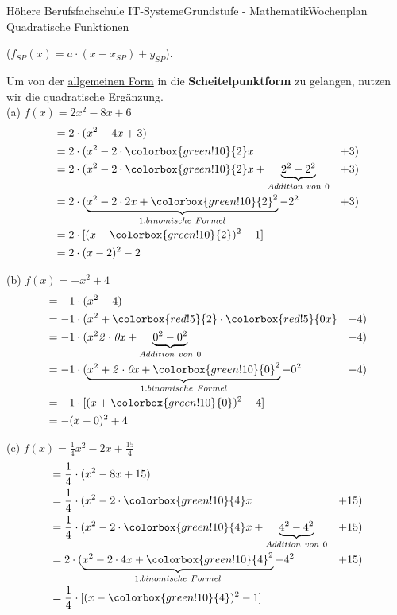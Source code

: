 \documentclass[oneside,openany,headings=optiontotoc,11pt,numbers=noenddot]{scrreprt}
\begin{document}
\begin{worksheet}{Höhere Berufsfachschule IT-Systeme}{Grundstufe - Mathematik}{Wochenplan Quadratische Funktionen}
\begin{framed}
			(\(f_{SP}(x) = a\cdot(x - x_{SP}) + y_{SP}\)).\\
			\par\noindent
			Um von der \underline{allgemeinen Form} in die \textbf{Scheitelpunktform} zu gelangen, nutzen wir die quadratische Ergänzung.\\
			(a) \(f(x) = 2x^2-8x+6\)\\
			\begin{align*}
				& = 2\cdot{}(x^2-4x+3)\\
				& = 2\cdot{}(x^2 - 2\cdot{}\colorbox{green!10}{2}x & +3)\\
				& = 2\cdot{}(x^2 - 2\cdot{}\colorbox{green!10}{2}x + \underbrace{2^2 - 2^2}_{Addition\ von\ 0} & + 3)\\
				& = 2\cdot{}(\underbrace{x^2-2\cdot{}2x + \colorbox{green!10}{2}^2}_{1. binomische\ Formel} -2^2 & + 3)\\
				& = 2\cdot{}[(x-\colorbox{green!10}{2})^2 - 1]\\
				& = 2\cdot{}(x-2)^2 - 2
			\end{align*}
			\par\noindent
			(b) \(f(x) = -x^2+4\)
			\begin{align*}
				& = -1\cdot{}(x^2-4)\\
				& = -1\cdot{}(x^2 + \colorbox{red!5}{2}\cdot{}\colorbox{red!5}{0x} & - 4)\\
				& = -1\cdot{}(x^2 \mathit{2\cdot{}0x} + \underbrace{0^2 - 0^2}_{Addition\ von\ 0} & - 4)\\
				& = -1\cdot{}(\underbrace{x^2 + \mathit{2\cdot{}0x} + \colorbox{green!10}{0}^2}_{1. binomische\ Formel} - 0^2 & - 4)\\
				& = -1\cdot{}[(x+\colorbox{green!10}{0})^2 - 4]\\
				& = -(x-0)^2 +4
			\end{align*}
			\par\noindent
			(c) \(f(x) = \frac{1}{4}x^2-2x+\frac{15}{4}\)
			\begin{align*}
				& = \frac{1}{4}\cdot(x^2-8x+15)\\
				& = \frac{1}{4}\cdot{}(x^2 - 2\cdot{}\colorbox{green!10}{4}x & + 15)\\
				& = \frac{1}{4}\cdot{}(x^2 - 2\cdot{}\colorbox{green!10}{4}x + \underbrace{4^2 - 4^2}_{Addition\ von\ 0} & + 15)\\
				& = 2\cdot{}(\underbrace{x^2-2\cdot{}4x + \colorbox{green!10}{4}^2}_{1. binomische\ Formel} -4^2 & + 15)\\
				& = \frac{1}{4}\cdot{}[(x-\colorbox{green!10}{4})^2 - 1]\\

\end{align*}
\end{framed}
\end{worksheet}
\end{document}
